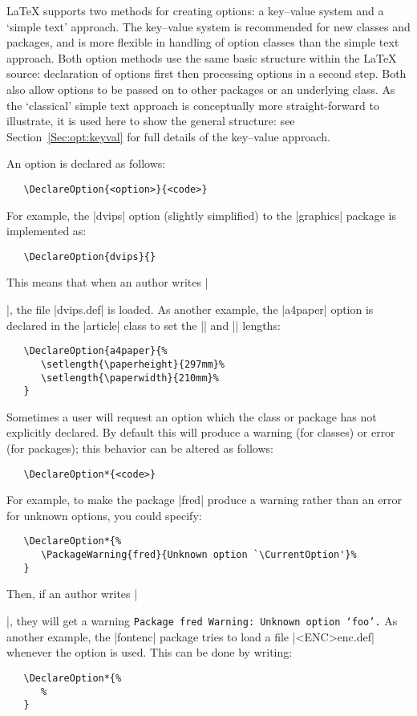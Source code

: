\documentclass{ltxguide}
\begin{document}
\LaTeX{} supports two methods for creating options: a key--value system and a
`simple text' approach. The key--value system is recommended for new classes
and packages, and is more flexible in handling of option classes than the
simple text approach. Both option methods use the same basic structure within
the \LaTeX{} source: declaration of options first then processing options in a
second step. Both also allow options to be passed on to other packages or an
underlying class. As the `classical' simple text approach is conceptually more
straight-forward to illustrate, it is used here to show the general structure:
see Section~\ref{Sec:opt:keyval} for full details of the key--value approach.

An option is declared as follows:
\begin{verbatim}
   \DeclareOption{<option>}{<code>}
\end{verbatim}
For example, the |dvips| option (slightly simplified)
to the |graphics| package is implemented as:
\begin{verbatim}
   \DeclareOption{dvips}{}
\end{verbatim}
This means that when an author writes |\usepackage[dvips]{graphics}|, the file
|dvips.def| is loaded. As another example, the |a4paper| option is declared in
the |article| class to set the |\paperheight| and |\paperwidth| lengths:
\begin{verbatim}
   \DeclareOption{a4paper}{%
      \setlength{\paperheight}{297mm}%
      \setlength{\paperwidth}{210mm}%
   }
\end{verbatim}
Sometimes a user will request an option which the class or package has not
explicitly declared. By default this will produce a warning (for classes) or
error (for packages); this behavior can be altered as follows:
\begin{verbatim}
   \DeclareOption*{<code>}
\end{verbatim}
For example, to make the package |fred| produce a warning rather than an error
for unknown options, you could specify:
\begin{verbatim}
   \DeclareOption*{%
      \PackageWarning{fred}{Unknown option `\CurrentOption'}%
   }
\end{verbatim}
Then, if an author writes |\usepackage[foo]{fred}|, they will get a warning
\texttt{Package fred Warning: Unknown option `foo'.} As another example, the
|fontenc| package tries to load a file |<ENC>enc.def| whenever the 
option is used. This can be done by writing:
\begin{verbatim}
   \DeclareOption*{%
      %
   }
\end{verbatim}
\end{document}
